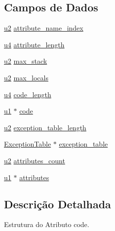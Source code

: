 \subsection*{Campos de Dados}
\begin{DoxyCompactItemize}
\item 
\hyperlink{_e___j_v_m_8h_a5f223212eef04d10a4550ded680cb1cf}{u2} \hyperlink{struct_code_attribute_a87132111c747d163d9b94ec155c1e1db}{attribute\+\_\+name\+\_\+index}
\item 
\hyperlink{_e___j_v_m_8h_aedf6ddc03df8caaaccbb4c60b9a9b850}{u4} \hyperlink{struct_code_attribute_a612405902fb38f8f04e8cd55e875a3a5}{attribute\+\_\+length}
\item 
\hyperlink{_e___j_v_m_8h_a5f223212eef04d10a4550ded680cb1cf}{u2} \hyperlink{struct_code_attribute_a61e8f2685ef2bb170d72e402a0e72ca2}{max\+\_\+stack}
\item 
\hyperlink{_e___j_v_m_8h_a5f223212eef04d10a4550ded680cb1cf}{u2} \hyperlink{struct_code_attribute_a1407b9bddee5eca9e0b0b20fbf1a8f1f}{max\+\_\+locals}
\item 
\hyperlink{_e___j_v_m_8h_aedf6ddc03df8caaaccbb4c60b9a9b850}{u4} \hyperlink{struct_code_attribute_a6758c92d94ab2ba7db0ddc3e5f4520bc}{code\+\_\+length}
\item 
\hyperlink{_e___j_v_m_8h_a216a9f8b04b4f0af84a4ca9d1d85a6ca}{u1} $\ast$ \hyperlink{struct_code_attribute_ace67f68bc8bc1d0ee3f86f173a83d7aa}{code}
\item 
\hyperlink{_e___j_v_m_8h_a5f223212eef04d10a4550ded680cb1cf}{u2} \hyperlink{struct_code_attribute_a7c7ee411e88e741a868818e3cc2171ca}{exception\+\_\+table\+\_\+length}
\item 
\hyperlink{struct_exception_table}{Exception\+Table} $\ast$ \hyperlink{struct_code_attribute_a6140184ac696cdd4d000aa00388c5a0f}{exception\+\_\+table}
\item 
\hyperlink{_e___j_v_m_8h_a5f223212eef04d10a4550ded680cb1cf}{u2} \hyperlink{struct_code_attribute_a550161b02b161e5ab2c489d33831d175}{attributes\+\_\+count}
\item 
\hyperlink{_e___j_v_m_8h_a216a9f8b04b4f0af84a4ca9d1d85a6ca}{u1} $\ast$ \hyperlink{struct_code_attribute_adafab3efe6d9eefdead891ef70badea8}{attributes}
\end{DoxyCompactItemize}


\subsection{Descrição Detalhada}
Estrutura do Atributo code. 

